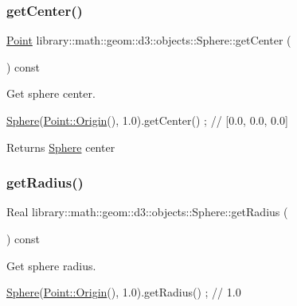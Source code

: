 \subsubsection{\texorpdfstring{get\+Center()}{getCenter()}}
{\footnotesize\ttfamily \hyperlink{classlibrary_1_1math_1_1geom_1_1d3_1_1objects_1_1_point}{Point} library\+::math\+::geom\+::d3\+::objects\+::\+Sphere\+::get\+Center (\begin{DoxyParamCaption}{ }\end{DoxyParamCaption}) const}



Get sphere center. 


\begin{DoxyCode}
\hyperlink{classlibrary_1_1math_1_1geom_1_1d3_1_1objects_1_1_sphere_a55dccc8ea16ee55cd7694c26afa8ea39}{Sphere}(\hyperlink{classlibrary_1_1math_1_1geom_1_1d3_1_1objects_1_1_point_ab2a38e285c562e50bf350272c083986f}{Point::Origin}(), 1.0).getCenter() ; \textcolor{comment}{// [0.0, 0.0, 0.0]}
\end{DoxyCode}


\begin{DoxyReturn}{Returns}
\hyperlink{classlibrary_1_1math_1_1geom_1_1d3_1_1objects_1_1_sphere}{Sphere} center 
\end{DoxyReturn}
\mbox{\label{classlibrary_1_1math_1_1geom_1_1d3_1_1objects_1_1_sphere_a48cfc72b6eec9a953fb837a13e1df45e}} 
\subsubsection{\texorpdfstring{get\+Radius()}{getRadius()}}
{\footnotesize\ttfamily Real library\+::math\+::geom\+::d3\+::objects\+::\+Sphere\+::get\+Radius (\begin{DoxyParamCaption}{ }\end{DoxyParamCaption}) const}



Get sphere radius. 


\begin{DoxyCode}
\hyperlink{classlibrary_1_1math_1_1geom_1_1d3_1_1objects_1_1_sphere_a55dccc8ea16ee55cd7694c26afa8ea39}{Sphere}(\hyperlink{classlibrary_1_1math_1_1geom_1_1d3_1_1objects_1_1_point_ab2a38e285c562e50bf350272c083986f}{Point::Origin}(), 1.0).getRadius() ; \textcolor{comment}{// 1.0}
\end{DoxyCode}


